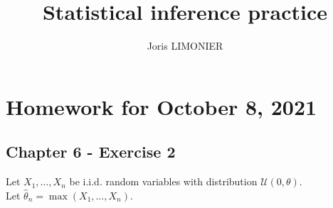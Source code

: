 \documentclass{article}
\title{Statistical inference practice}
\author{Joris LIMONIER}
\begin{document}
\maketitle

\tableofcontents

\section{Homework for October 8, 2021}
\subsection{Chapter 6 - Exercise 2}

Let \(X_1, \ldots, X_n\) be i.i.d. random variables with distribution \(\mathcal{U}(0, \theta)\). \\
Let \(\hat\theta_n = \max(X_1, \ldots, X_n)\).
\end{document}
